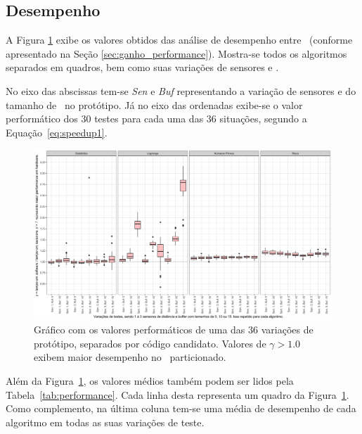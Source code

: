     \subsection{Desempenho}
    
        A Figura \ref{fig:performance} exibe os valores obtidos das análise de desempenho entre \hs\ (conforme apresentado na Seção \ref{sec:ganho_performance}).
        Mostra-se todos os algoritmos separados em quadros, bem como suas variações de sensores e \buffer.
        
        No eixo das abscissas tem-se \textit{Sen} e \textit{Buf} representando a variação de sensores e do tamanho de \buffer\ no protótipo.
        Já no eixo das ordenadas exibe-se o valor performático dos 30 testes para cada uma das 36 situações, segundo a Equação~\ref{eq:speedup1}.
        
        \begin{figure}[h] \centering
            \vspace{-0.5em}
            \includegraphics[width=1\textwidth]{img/performance.png}
            \caption{Gráfico com os valores performáticos de uma das 36 variações de protótipo, separados por código candidato. Valores de $\gamma > 1.0 $ exibem maior desempenho no \hardware\ particionado.}
            \label{fig:performance}
        \end{figure}
   
    
        Além da Figura~\ref{fig:performance}, os valores médios também podem ser lidos pela Tabela~\ref{tab:performance}.
        Cada linha desta representa um quadro da Figura~\ref{fig:performance}.
        Como complemento, na última coluna tem-se uma média de desempenho de cada algoritmo em todas as suas variações de teste.
        
